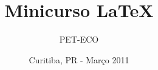 \documentclass{beamer}
\title{Minicurso \LaTeX}
\author{PET-ECO}
\institute{Universidade Teconlógica Federal do Paraná}
\date{Curitiba, PR - Março 2011}
\begin{document}
\begin{frame}
	\titlepage
\end{frame}





\end{document}

